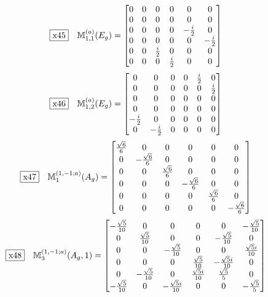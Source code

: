 \documentclass[fleqn,10pt,landscape]{jsarticle}
\begin{document}
\begin{dmath*}
\fbox{x45}\quad \mathbb{M}_{1,1}^{(a)}(E_{g})=\begin{bmatrix} 0 & 0 & 0 & 0 & 0 & 0 \\ 0 & 0 & 0 & 0 & 0 & 0 \\ 0 & 0 & 0 & 0 & - \frac{i}{2} & 0 \\ 0 & 0 & 0 & 0 & 0 & - \frac{i}{2} \\ 0 & 0 & \frac{i}{2} & 0 & 0 & 0 \\ 0 & 0 & 0 & \frac{i}{2} & 0 & 0 \end{bmatrix}
\end{dmath*}
\begin{dmath*}
\fbox{x46}\quad \mathbb{M}_{1,2}^{(a)}(E_{g})=\begin{bmatrix} 0 & 0 & 0 & 0 & \frac{i}{2} & 0 \\ 0 & 0 & 0 & 0 & 0 & \frac{i}{2} \\ 0 & 0 & 0 & 0 & 0 & 0 \\ 0 & 0 & 0 & 0 & 0 & 0 \\ - \frac{i}{2} & 0 & 0 & 0 & 0 & 0 \\ 0 & - \frac{i}{2} & 0 & 0 & 0 & 0 \end{bmatrix}
\end{dmath*}
\begin{dmath*}
\fbox{x47}\quad \mathbb{M}_{1}^{(1,-1;a)}(A_{g})=\begin{bmatrix} \frac{\sqrt{6}}{6} & 0 & 0 & 0 & 0 & 0 \\ 0 & - \frac{\sqrt{6}}{6} & 0 & 0 & 0 & 0 \\ 0 & 0 & \frac{\sqrt{6}}{6} & 0 & 0 & 0 \\ 0 & 0 & 0 & - \frac{\sqrt{6}}{6} & 0 & 0 \\ 0 & 0 & 0 & 0 & \frac{\sqrt{6}}{6} & 0 \\ 0 & 0 & 0 & 0 & 0 & - \frac{\sqrt{6}}{6} \end{bmatrix}
\end{dmath*}
\begin{dmath*}
\fbox{x48}\quad \mathbb{M}_{3}^{(1,-1;a)}(A_{g},1)=\begin{bmatrix} - \frac{\sqrt{5}}{10} & 0 & 0 & 0 & 0 & - \frac{\sqrt{5}}{10} \\ 0 & \frac{\sqrt{5}}{10} & 0 & 0 & - \frac{\sqrt{5}}{10} & 0 \\ 0 & 0 & - \frac{\sqrt{5}}{10} & 0 & 0 & \frac{\sqrt{5} i}{10} \\ 0 & 0 & 0 & \frac{\sqrt{5}}{10} & - \frac{\sqrt{5} i}{10} & 0 \\ 0 & - \frac{\sqrt{5}}{10} & 0 & \frac{\sqrt{5} i}{10} & \frac{\sqrt{5}}{5} & 0 \\ - \frac{\sqrt{5}}{10} & 0 & - \frac{\sqrt{5} i}{10} & 0 & 0 & - \frac{\sqrt{5}}{5} \end{bmatrix}
\end{dmath*}
\end{document}
